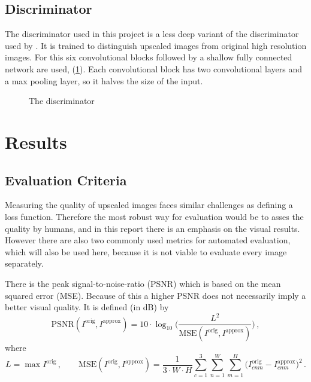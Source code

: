 \documentclass{scrartcl}
\begin{document}
\subsection{Discriminator}

The discriminator used in this project is a less deep variant of the discriminator used by \textcite{stylegan0}.
It is trained to distinguish upscaled images from original high resolution images.
For this six convolutional blocks followed by a shallow fully connected network are used, (\cref{fig:discriminator}).
Each convolutional block has two convolutional layers and a max pooling layer, so it halves the size of the input.

\begin{figure}
	\begin{center}
		
		\caption{The discriminator}
		\label{fig:discriminator}
	\end{center}
\end{figure}

\section{Results}

\subsection{Evaluation Criteria}

Measuring the quality of upscaled images faces similar challenges as defining a loss function.
Therefore the most robust way for evaluation would be to asses the quality by humans, and in this report there is an emphasis on the visual results.
However there are also two commonly used metrics for automated evaluation, which will also be used here, because it is not viable to evaluate every image separately.

There is the peak signal-to-noise-ratio (PSNR) which is based on the mean squared error (MSE).
Because of this a higher PSNR does not necessarily imply a better visual quality.
It is defined (in dB) by
\[
	\mathrm{PSNR}(I^{\mathrm{orig}}, I^{\mathrm{approx}})
	= 10\cdot \log_{10}\Big(\frac{L^2}{\mathrm{MSE}(I^{\mathrm{orig}}, I^{\mathrm{approx}})}\Big)
	\,,
\]
where
\[
	L = \max I^{\mathrm{orig}}\,,
	\qquad
	\mathrm{MSE}(I^{\mathrm{orig}}, I^{\mathrm{approx}})
	= \frac{1}{3\cdot W \cdot H} \sum_{c=1}^3\sum_{n=1}^W\sum_{m=1}^H \Big(I^{\mathrm{orig}}_{cnm} - I^{\mathrm{approx}}_{cnm}\Big)^2
	\,.
\]
\end{document}
